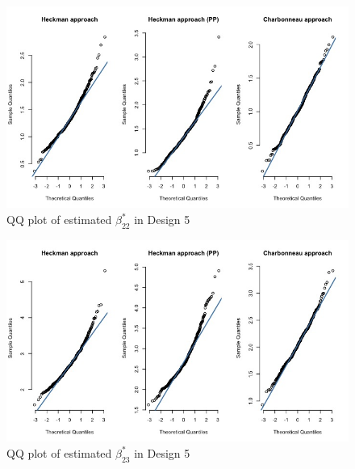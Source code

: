 \begin{figure}[htbp]
    \vspace{-2.5em}%
    \begin{adjustwidth}{-.5in}{-.5in}
\centerline{\includegraphics[scale=.4]{content/Figures/QQ_beta_22_Design5.png}}
\caption{\footnotesize{QQ plot of estimated $\beta_{22}^*$ in Design 5}}
\label{QQ_beta_22_Design5}
\end{adjustwidth}
\end{figure}
\begin{figure}[htbp]
    \vspace{-2.5em}%
    \begin{adjustwidth}{-.5in}{-.5in}
\centerline{\includegraphics[scale=.4]{content/Figures/QQ_beta_23_Design5.png}}
\caption{\footnotesize{QQ plot of estimated $\beta_{23}^*$ in Design 5}}
\label{QQ_beta_23_Design5}
\end{adjustwidth}
\end{figure}
